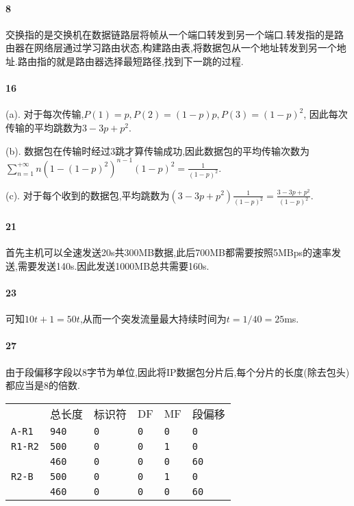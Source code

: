 \documentclass[a4paper]{article}
\begin{document}
\paragraph{8}
交换指的是交换机在数据链路层将帧从一个端口转发到另一个端口.转发指的是路由器在网络层通过学习路由状态,构建路由表,将数据包从一个地址转发到另一个地址.路由指的就是路由器选择最短路径,找到下一跳的过程.
\paragraph{16}
(a). 对于每次传输,$P(1)=p,P(2)=(1-p)p,P(3)=(1-p)^2$, 因此每次传输的平均跳数为$3-3p+p^2$.

(b). 数据包在传输时经过3跳才算传输成功,因此数据包的平均传输次数为$\sum_{n=1}^{+\infty}n(1-(1-p)^2)^{n-1}(1-p)^2=\frac{1}{(1-p)^2}$.

(c). 对于每个收到的数据包,平均跳数为$(3-3p+p^2)\frac{1}{(1-p)^2}=\frac{3-3p+p^2}{(1-p)^2}$.
\paragraph{21}
首先主机可以全速发送20s共300MB数据,此后700MB都需要按照5MBps的速率发送,需要发送140s.因此发送1000MB总共需要160s.
\paragraph{23}
可知$10t+1=50t$,从而一个突发流量最大持续时间为$t=1/40=25$ms.
\paragraph{27}
由于段偏移字段以8字节为单位,因此将IP数据包分片后,每个分片的长度(除去包头)都应当是8的倍数.
\begin{table}[H]
    \begin{tabular}{|llllll|}
        \hline
                     & 总长度        & 标识符      & DF       & MF       & 段偏移       \\
        \verb|A-R1|  & \verb|940| & \verb|0| & \verb|0| & \verb|0| & \verb|0|  \\
        \verb|R1-R2| & \verb|500| & \verb|0| & \verb|0| & \verb|1| & \verb|0|  \\
                     & \verb|460| & \verb|0| & \verb|0| & \verb|0| & \verb|60| \\
        \verb|R2-B|  & \verb|500| & \verb|0| & \verb|0| & \verb|1| & \verb|0|  \\
                     & \verb|460| & \verb|0| & \verb|0| & \verb|0| & \verb|60| \\ \hline
    \end{tabular}
\end{table}
\end{document}
